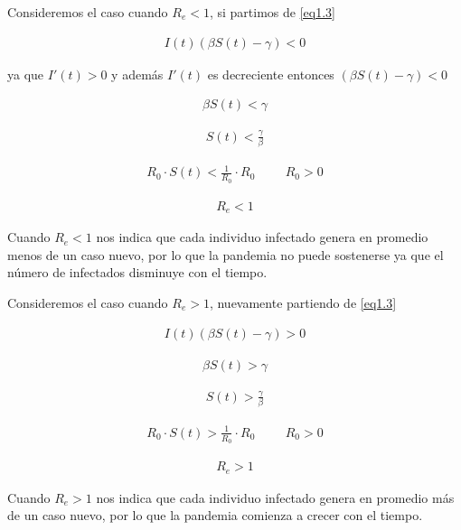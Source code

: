 \begin{Dem}

Consideremos  el caso cuando  $R_{e} < 1$, si partimos de {\ref{eq1.3}} 

\begin{align*}
I(t) (\beta S(t) - \gamma)  <  0 
\end{align*}

ya que  $I'(t) > 0$ y además $I'(t)$ es decreciente  entonces  $(\beta S(t)  - \gamma) < 0$ 

\begin{align*}
\beta S(t)  < \gamma 
\end{align*}

\begin{align*}
S(t)  < \frac{\gamma}{\beta} 
\end{align*}

\begin{align*}
R_{0} \cdot S(t)  < \frac{1}{R_{0}} \cdot R_{0}  \hspace{1cm} R_{0} > 0
\end{align*}

\begin{align*}
R_{e}  < 1
\end{align*}

Cuando $R_{e}  < 1$ nos indica que cada individuo infectado genera en promedio menos de un caso nuevo, por lo que la pandemia no puede sostenerse ya que el número de infectados disminuye con el tiempo. 


Consideremos  el caso cuando  $R_{e} > 1$, nuevamente partiendo de {\ref{eq1.3}} 

\begin{align*}
I(t) (\beta S(t) - \gamma)  > 0 
\end{align*}

\begin{align*}
\beta S(t)  > \gamma 
\end{align*}

\begin{align*}
S(t)  > \frac{\gamma}{\beta} 
\end{align*}

\begin{align*}
R_{0} \cdot S(t)  > \frac{1}{R_{0}} \cdot R_{0} \hspace{1cm} R_{0} > 0
\end{align*}

\begin{align*}
R_{e}  > 1
\end{align*}

Cuando $R_{e}  > 1$ nos indica que cada individuo infectado genera en promedio más de un caso nuevo, por lo que la pandemia comienza a crecer con el tiempo. 

\end{Dem}

